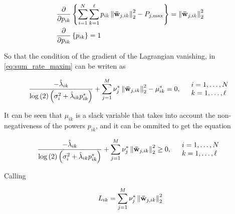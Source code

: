 \begin{equation} \label{eq:gradient_constraints}
\begin{aligned}
    &\frac{\partial}{\partial p_{ik}} \left\{
    \sum\limits_{i = 1}^N \sum\limits_{k = 1}^\ell p_{ik}
    \left\| \wbar_{j,ik} \right\|_2^2 - P_{j,\max}
    \right\} = \left\| \wbar_{j,ik} \right\|_2^2 \\
%
    &\frac{\partial}{\partial p_{ik}} \left\{ p_{ik} \right\} = 1
\end{aligned}
\end{equation}

So that the condition of the gradient of the Lagrangian vanishing, in
\eqref{eq:sum_rate_maxim} can be writen as

\begin{equation} \label{eq:gradient_vanishing}
    \frac{-\hat{\lambda}_{ik}}{\log\left(2\right)\left(\sigma_i^2 +
    \hat{\lambda}_{ik} p_{ik}^\ast\right)} +
    \sum\limits_{j = 1}^M \nu_j^\ast \left\|\mathbf{\bar{w}}_{j, ik}\right\|_2^2 -
    \mu_{ik}^\ast = 0,\quad
	\begin{array}{l}
        i = 1, \ldots, N\\
        k = 1, \ldots, \ell
	\end{array}\\
\end{equation}

It can be seen that $\mu_{ik}$ is a slack variable that takes into account the
non-negativeness of the powers $p_{ik}$, and it can be ommited to get the
equation

\begin{equation} \label{eq:gradient_inequality}
    \frac{-\hat{\lambda}_{ik}}{\log\left(2\right)\left(\sigma_i^2 +
    \hat{\lambda}_{ik} p_{ik}^\ast\right)} +
    \sum\limits_{j = 1}^M \nu_j^\ast \left\|\mathbf{\bar{w}}_{j, ik}\right\|_2^2
    \geq 0,\quad
	\begin{array}{l}
        i = 1, \ldots, N\\
        k = 1, \ldots, \ell
	\end{array}\\
\end{equation}

Calling

\begin{equation} \label{eq:term_columns_w}
    L_{ik} = \sum\limits_{j = 1}^M \nu_j^\ast \left\|\mathbf{\bar{w}}_{j, ik}\right\|_2^2
\end{equation}

